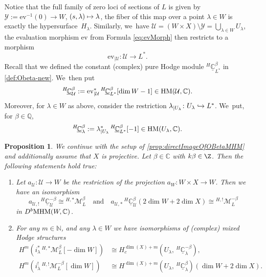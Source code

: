\documentclass[JEP,XML,SOM,Unicode,published]{cedram}
\let\mathds\mathbb
\newcommand\mto{\mathchoice{\longmapsto}{\mapsto}{\mapsto}{\mapsto}}
\newcommand\hto{\mathrel{\lhook\joinrel\to}}
\newcommand{\quand}{\quad\text{and}\quad}
\newcommand{\ev}{\mathrm{ev}}
\newtheorem{prop}[thm]{Proposition}
\newcommand{\dC}{{\mathds C}}\let\C\dC
\newcommand{\dQ}{{\mathds Q}}\let\Q\dQ
\newcommand{\dN}{{\mathds N}}\let\N\dN
\newcommand{\cM}{\mathcal{M}}
\newcommand{\cU}{\mathcal{U}}\let\mcu\cU
\newcommand{\cY}{\mathcal{Y}}\let\mcy\cY
\newcommand{\MHM}{\textup{MHM}}
\newcommand{\HM}{\textup{HM}}
\newcommand{\Mh}{{^{H,*}}\cM_L^\beta}
\newcommand{\MhD}{{^{H,!}}\cM_L^{-\beta}}
\begin{document}
Notice that the full family of zero loci of sections of $L$ is given by $\cY:=\ev^{-1}(0) \to W$, $(s,\lambda)\mto \lambda$, \ie the fiber of this map over a point $\lambda\in W$ is exactly the hypersurface~$H_\lambda$.
Similarly, we~have
$\cU =(W\times X)\setminus \cY = \bigcup_{\lambda\in W} U_\lambda$, the evaluation morphism $\ev$ from Formula
\eqref{eq:evMorph} then restricts to a morphism
\[
\ev_{|\cU} \colon \cU \to L^*.
\]
Recall that we defined the constant (complex) pure Hodge module $^{H\!}\underline{\dC}^\beta_{L^*}$ in \cref{def:Obeta-new}. We~then put
\[
^{H\!}\underline{\dC}^\beta_{\cU} := {\ev_{|\cU}^*}
\,{^{H\!}}\underline{\dC}^\beta_{L^*}[\dim W -1]
\in\HM(\cU,\dC).
\]
Moreover, for $\lambda\in W$ as above, consider
the restriction $\lambda_{|U_\lambda}\colon U_\lambda
\hto L^*$. We~put, for $\beta\in \dQ$,
\[
{}^{H\!}\underline{\dC}^\beta_\lambda:=\lambda^*_{|U_\lambda}\, ^{H\!}\underline{\dC}^\beta_{L^*}[-1]\in \HM(U_\lambda,\dC).
\]

\begin{prop}\label{prop:TautIsDirectImage} We continue with the setup of \cref{prop:directImageOfOBetaMHM} and additionally assume that $X$ is projective. Let $\beta \in \C$ with $k\beta \in \Z$. Then the following statements hold true:
\begin{enumerate}
\item\label{prop:TautIsDirectImage1}
Let $a_{\cU}\colon \cU\to W$ be the restriction of the projection $a_W\colon W\times X\to W$. Then we have an isomorphism
\[
a_{\cU,!} \, ^{H\!}\underline{\dC}^{-\beta}_{\cU}
\cong \Mh
\quand
a_{\cU,*} \, ^{H\!}\underline{\dC}^{\beta}_{\cU}(2 \dim W + 2\dim X)
\cong \MhD
\]
in $ D^b\MHM(W,\dC)$.
\item\label{prop:TautIsDirectImage2}
For any $m \in \dN$, and any $\lambda\in W$ we have isomorphisms of (complex) mixed Hodge structures
\begin{align*}
H^m(i_\lambda^* \, \Mh[-\dim W]) &\cong H_c^{\dim(X) + m}(U_\lambda,\,^{H\!}\underline{\dC}^{-\beta}_\lambda), \\
H^m(i_\lambda^! \, \MhD[\dim W]) &\cong H^{\dim(X)+m}(U_\lambda,\,^{H\!}\underline{\dC}^{\beta}_\lambda) (\dim W + 2 \dim X). 
\end{align*}
\end{enumerate}
\end{prop}
\end{document}
